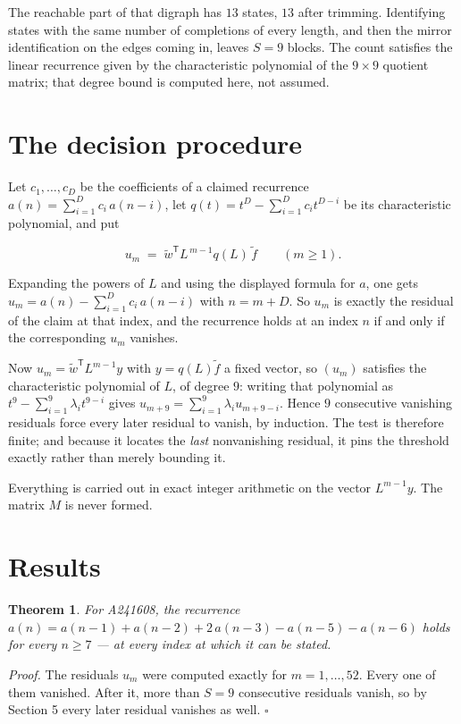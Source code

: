 \documentclass[11pt]{article}
\newtheorem{theorem}{Theorem}
\theoremstyle{definition}
\begin{document}
The reachable part of that digraph has $13$ states, $13$ after trimming. Identifying states with the same number of completions of every length, and then the mirror identification on the edges coming in, leaves $S = 9$ blocks. The count satisfies the linear recurrence given by the characteristic polynomial of the $9\times9$ quotient matrix; that degree bound is computed here, not assumed.

\section{The decision procedure}

Let $c_1,\dots,c_D$ be the coefficients of a claimed recurrence $a(n) = \sum_{i=1}^{D} c_i\,a(n-i)$, let $q(t) = t^{D} - \sum_{i=1}^{D} c_i t^{D-i}$ be its characteristic polynomial, and put

\[u_m \;=\; \tilde w^{\mathsf T} L^{\,m-1} q(L)\,\tilde f \qquad (m \ge 1).\]

Expanding the powers of $L$ and using the displayed formula for $a$, one gets $u_m = a(n) - \sum_{i=1}^{D} c_i\,a(n-i)$ with $n = m + D$. So $u_m$ is exactly the residual of the claim at that index, and the recurrence holds at an index $n$ if and only if the corresponding $u_m$ vanishes.

Now $u_m = \tilde w^{\mathsf T} L^{m-1} y$ with $y = q(L)\tilde f$ a fixed vector, so $(u_m)$ satisfies the characteristic polynomial of $L$, of degree $9$: writing that polynomial as $t^{9} - \sum_{i=1}^{9} \lambda_i t^{9-i}$ gives $u_{m+9} = \sum_{i=1}^{9} \lambda_i u_{m+9-i}$. Hence $9$ consecutive vanishing residuals force every later residual to vanish, by induction. The test is therefore finite; and because it locates the {\itshape last} nonvanishing residual, it pins the threshold exactly rather than merely bounding it.

Everything is carried out in exact integer arithmetic on the vector $L^{m-1}y$. The matrix $M$ is never formed.

\section{Results}

\begin{theorem} For A241608, the recurrence $a(n) = a(n-1) + a(n-2) + 2\,a(n-3) - a(n-5) - a(n-6)$ holds for every $n \ge 7$ --- at every index at which it can be stated.\end{theorem}

{\itshape Proof.} The residuals $u_m$ were computed exactly for $m = 1,\dots,52$. Every one of them vanished. After it, more than $S = 9$ consecutive residuals vanish, so by Section 5 every later residual vanishes as well. $\square$
\end{document}
